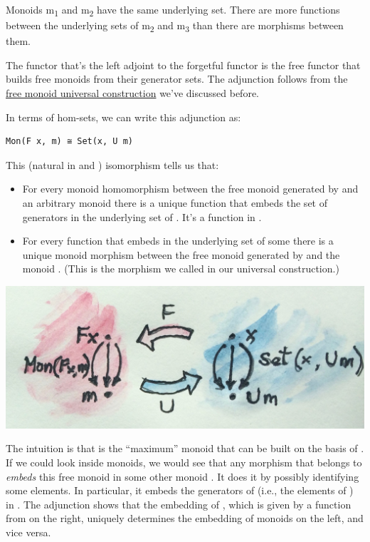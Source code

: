 Monoids m\textsubscript{1} and m\textsubscript{2} have the same
underlying set. There are more functions between the underlying sets of
m\textsubscript{2} and m\textsubscript{3} than there are morphisms
between them.

The functor  that's the left adjoint to the forgetful functor
 is the free functor that builds free monoids from their
generator sets. The adjunction follows from the
\href{https://bartoszmilewski.com/2015/07/21/free-monoids/}{free monoid
universal construction} we've discussed before.

In terms of hom-sets, we can write this adjunction as:

\begin{verbatim}
Mon(F x, m) ≅ Set(x, U m)
\end{verbatim}

This (natural in  and ) isomorphism tells us that:

\begin{itemize}
\tightlist
\item
  For every monoid homomorphism between the free monoid 
  generated by  and an arbitrary monoid  there is a
  unique function that embeds the set of generators  in the
  underlying set of . It's a function in
  .
\item
  For every function that embeds  in the underlying set of
  some  there is a unique monoid morphism between the free
  monoid generated by  and the monoid . (This is the
  morphism we called  in our universal construction.)
\end{itemize}

\includegraphics[width=5.33333in]{images/freemonadjunction.jpg}

The intuition is that  is the ``maximum'' monoid that can
be built on the basis of . If we could look inside monoids, we
would see that any morphism that belongs to 
\emph{embeds} this free monoid in some other monoid . It does
it by possibly identifying some elements. In particular, it embeds the
generators of  (i.e., the elements of ) in
. The adjunction shows that the embedding of , which
is given by a function from  on the right,
uniquely determines the embedding of monoids on the left, and vice
versa.

